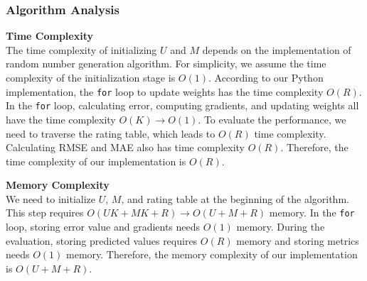 \documentclass[12pt]{article}
\begin{document}
\subsubsection{Algorithm Analysis}
\noindent\textbf{Time Complexity}\\
The time complexity of initializing $U$ and $M$ depends on the implementation of random number generation algorithm. For simplicity, we assume the time complexity of the initialization stage is $O(1)$. According to our Python implementation, the \texttt{for} loop to update weights has the time complexity $O(R)$. In the \texttt{for} loop, calculating error, computing gradients, and updating weights all have the time complexity $O(K) \rightarrow O(1)$. To evaluate the performance, we need to traverse the rating table, which leads to $O(R)$ time complexity. Calculating RMSE and MAE also has time complexity $O(R)$. Therefore, the time complexity of our implementation is $O(R)$.\par 
\vspace{0.3cm}
\noindent\textbf{Memory Complexity}\\
We need to initialize $U$, $M$, and rating table at the beginning of the algorithm. This step requires $O(UK + MK + R)\rightarrow O(U + M + R)$ memory. In the \texttt{for} loop, storing error value and gradients needs $O(1)$ memory. During the evaluation, storing predicted values requires $O(R)$ memory and storing metrics needs $O(1)$ memory. Therefore, the memory complexity of our implementation is $O(U + M + R)$.
\end{document}
